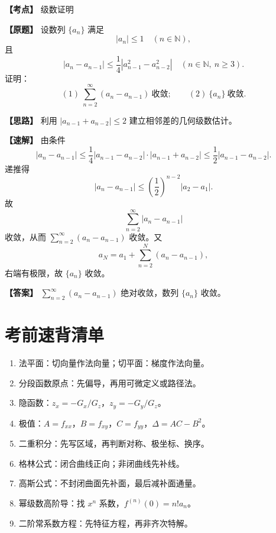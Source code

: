 ﻿\documentclass[11pt,a4paper,UTF8]{ctexart}
\begin{document}
\newpage

\begin{answerbox}[2021--2022 五-15]
\textbf{【考点】} 级数证明

\textbf{【原题】} 设数列 $\{a_n\}$ 满足
\[
|a_n|\le1\quad(n\in\mathbb N),
\]
且
\[
|a_n-a_{n-1}|\le\frac14|a_{n-1}^2-a_{n-2}^2|
\quad(n\in\mathbb N,\ n\ge3).
\]
证明：
\[
(1)\ \sum_{n=2}^{\infty}(a_n-a_{n-1})\ \text{收敛};
\qquad
(2)\ \{a_n\}\ \text{收敛}.
\]

\textbf{【思路】} 利用 $|a_{n-1}+a_{n-2}|\le2$ 建立相邻差的几何级数估计。

\textbf{【速解】} 由条件
\[
|a_n-a_{n-1}|
\le\frac14|a_{n-1}-a_{n-2}|\cdot |a_{n-1}+a_{n-2}|
\le\frac12|a_{n-1}-a_{n-2}|.
\]
递推得
\[
|a_n-a_{n-1}|\le \left(\frac12\right)^{n-2}|a_2-a_1|.
\]
故
\[
\sum_{n=2}^{\infty}|a_n-a_{n-1}|
\]
收敛，从而 $\sum_{n=2}^{\infty}(a_n-a_{n-1})$ 收敛。又
\[
a_N=a_1+\sum_{n=2}^{N}(a_n-a_{n-1}),
\]
右端有极限，故 $\{a_n\}$ 收敛。

\textbf{【答案】} $\sum_{n=2}^{\infty}(a_n-a_{n-1})$ 绝对收敛，数列 $\{a_n\}$ 收敛。
\end{answerbox}
\section{考前速背清单}

\begin{scorebox}[必须会写]
\begin{enumerate}[leftmargin=2em]
\item 法平面：切向量作法向量；切平面：梯度作法向量。
\item 分段函数原点：先偏导，再用可微定义或路径法。
\item 隐函数：$z_x=-G_x/G_z$，$z_y=-G_y/G_z$。
\item 极值：$A=f_{xx}$，$B=f_{xy}$，$C=f_{yy}$，$\Delta=AC-B^2$。
\item 二重积分：先写区域，再判断对称、极坐标、换序。
\item 格林公式：闭合曲线正向；非闭曲线先补线。
\item 高斯公式：不封闭曲面先补面，最后减补面通量。
\item 幂级数高阶导：找 $x^n$ 系数，$f^{(n)}(0)=n!a_n$。
\item 二阶常系数方程：先特征方程，再非齐次特解。
\end{enumerate}
\end{scorebox}
\end{document}
